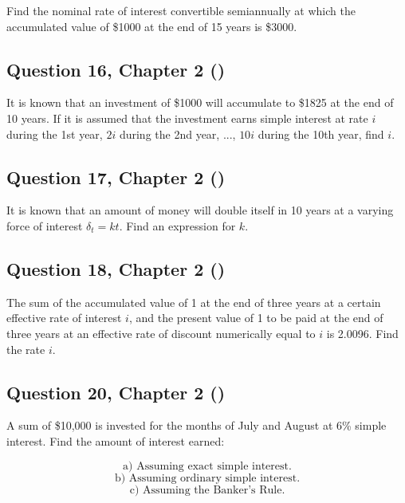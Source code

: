 \documentclass[12pt, a4paper]{article}
\begin{document}
\noindent Find the nominal rate of interest convertible semiannually at which the accumulated value of \$1000 at the end of 15 years is \$3000.

\bigskip



\subsection*{Question 16, Chapter 2 (\cite{toi3rd})}

\noindent It is known that an investment of \$1000 will accumulate to \$1825 at the end of 10 years. If it is assumed that the investment earns simple interest at rate \( i \) during the 1st year, \( 2i \) during the 2nd year, ..., \( 10i \) during the 10th year, find \( i \).

\bigskip



\subsection*{Question 17, Chapter 2 (\cite{toi3rd})}

\noindent It is known that an amount of money will double itself in 10 years at a varying force of interest \( \delta_t = kt \). Find an expression for \( k \).

\bigskip



\subsection*{Question 18, Chapter 2 (\cite{toi3rd})}

\noindent The sum of the accumulated value of 1 at the end of three years at a certain effective rate of interest \( i \), and the present value of 1 to be paid at the end of three years at an effective rate of discount numerically equal to \( i \) is 2.0096. Find the rate \( i \).

\bigskip


\subsection*{Question 20, Chapter 2 (\cite{toi3rd})}

\noindent A sum of \$10,000 is invested for the months of July and August at 6\% simple interest. Find the amount of interest earned:

\[
\text{a) Assuming exact simple interest.}
\]
\[
\text{b) Assuming ordinary simple interest.}
\]
\[
\text{c) Assuming the Banker’s Rule.}
\]
\end{document}
